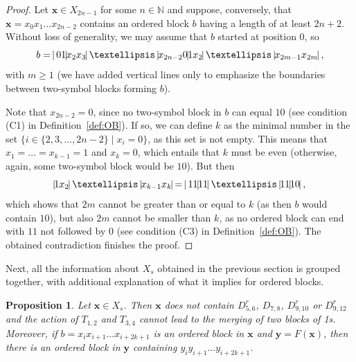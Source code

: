 \documentclass{sn-jnl}
\newtheorem{prop}{Proposition}%
\newcommand{\xconst}{X_{s}}
\newcommand{\bx}{\mathbf{x}}
\newcommand{\by}{\mathbf{y}}
\begin{document}
\begin{proof}
Let $\bx\in X_{2n-1}$ for some $n \in \mathbb{N}$ and suppose, conversely, that $\bx = x_0x_1\ldots x_{2n-2}$ contains an ordered block $b$ having a length of at least $2n+2$. Without loss of generality, we may assume that $b$ started at position $0$, so
\[
b = \;\vline 01\vline x_2x_3\vline\;\ldots\;\vline x_{2n-2}0\vline 1x_2\vline \;\ldots\;\vline x_{2m-1}x_{2m}\vline \; ,
\]
with $m\geq 1$ (we have added vertical lines only to emphasize the boundaries between two-symbol blocks forming $b$).

Note that $x_{2n-2} = 0$, since no two-symbol block in $b$ can equal $10$ (see condition {\rm (C1)} in Definition~\ref{def:OB}). If so, we can define $k$ as the minimal number in the set $\big\{ i\in\{2,3,\ldots,2n-2\}\mid x_i=0\big\}$, as this set is not empty. This means that $x_1=\ldots=x_{k-1}=1$ and $x_k=0$, which entails that $k$ must be even (otherwise, again, some two-symbol block would be $10$). But then
\[
\vline 1x_2\vline \;\ldots\;\vline x_{k-1}x_{k}\vline = \;\vline 11\vline  11\vline \;\ldots\;\vline  11\vline 10\vline \; ,
\]
which shows that $2m$ cannot be greater than or equal to $k$ (as then $b$ would contain $10$), but also $2m$ cannot be smaller than $k$, as no ordered block can end with $11$ not followed by $0$ (see condition {\rm (C3)} in Definition~\ref{def:OB}). The obtained contradiction finishes the proof.
\end{proof}


Next, all the information about $\xconst$ obtained in the previous section is grouped together, with additional explanation of what it implies for ordered blocks.

\begin{prop}\label{thm:5-12}
    Let $\bx\in \xconst$. Then $\bx$ does not contain $D_{5,6}^r$, $D_{7,8}$, $D_{9,10}^r$ or $D_{9,12}^r$ and the action of $T_{1,2}$ and $T_{3,4}$ cannot lead to the merging of two blocks of 1s. Moreover, if $b=x_{i}x_{i+1}\ldots x_{i+2k+1}$ is an ordered block in $\bx$ and $\by=F(\bx)$, then there is an ordered block in $\by$ containing $y_{i}y_{i+1}\ldots y_{i+2k+1}$.
\end{prop}
\end{document}
